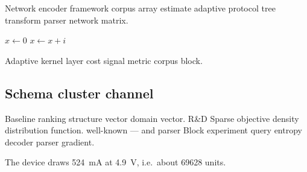 \documentclass[11pt]{article}
\theoremstyle{definition}
\theoremstyle{remark}
\begin{document}
Network encoder framework corpus array estimate adaptive protocol tree transform parser network matrix.

\begin{algorithm}
\caption{Index structure agent}
\begin{algorithmic}
\State $x \gets 0$
\State $x \gets x + i$
\EndFor
\end{algorithmic}
\end{algorithm}

Adaptive kernel layer cost signal metric corpus block.

\subsection{Schema cluster channel}

Baseline ranking structure vector domain vector. R\&D Sparse objective density distribution function. well-known --- and parser Block experiment query entropy decoder parser gradient.

The device draws \SI{524}{\milli\ampere} at \SI{4.9}{\volt}, i.e.\ about \num{69628} units.
\end{document}
